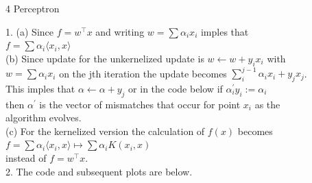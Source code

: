 \documentclass[18pt]{article}
\begin{document}
\begin{flushleft}
    

4 Perceptron

\vspace{.5cm}
1. (a) Since $f = w^{\top} x$ and writing $w=\sum \alpha_i x_i$ imples that\\
$f = \sum \alpha_i \langle x_i, x \rangle$\\
\vspace{.5cm}
(b) Since update for the unkernelized update is $ w \leftarrow w+y_i x_i$ with\\
$w = \sum \alpha_i x_i$ on the jth iteration the update becomes $\sum_i^{j-1} \alpha_i x_i+y_j x_j$.\\
This imples that $\alpha \longleftarrow \alpha + y_j$ or in the code below if $\alpha_i^{\prime} y_i := \alpha_i$\\
then $\alpha^{\prime}$ is the vector of mismatches that occur for point $x_i$ as the \\
algorithm evolves.\\
\vspace{.5cm}
(c) For the kernelized version the calculation of $f(x)$ becomes\\
\vspace{.5cm}
$f = \sum \alpha_i \langle x_i, x \rangle\longmapsto \sum \alpha_i K(x_i,x)$\\
\vspace{.5cm}
instead of $f=w^{\top}x$.\\
\vspace{.5cm}
2. The code and subsequent plots are below.

\end{flushleft}
\end{document}
